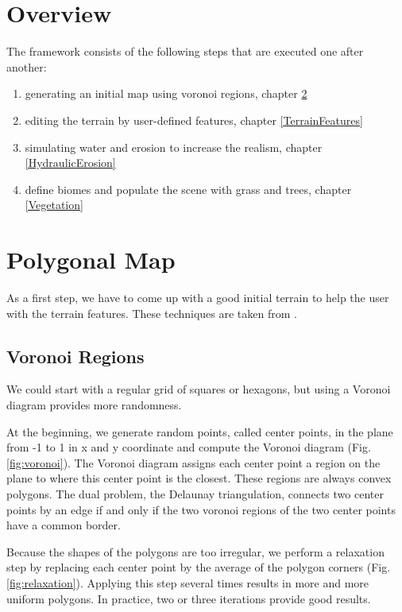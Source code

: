 \documentclass[journal, letterpaper]{IEEEtran}
\begin{document}
\section{Overview}
The framework consists of the following steps that are executed one after another:
\begin{enumerate}
	\item generating an initial map using voronoi regions, chapter \ref{PolygonalMap}
	\item editing the terrain by user-defined features, chapter \ref{TerrainFeatures}
	\item simulating water and erosion to increase the realism, chapter \ref{HydraulicErosion}
	\item define biomes and populate the scene with grass and trees, chapter \ref{Vegetation}
\end{enumerate}

\section{Polygonal Map}\label{PolygonalMap}
As a first step, we have to come up with a good initial terrain to help the user with the terrain features.
These techniques are taken from \cite{AmitPatel.2010}.

\subsection{Voronoi Regions}
We could start with a regular grid of squares or hexagons, but using a Voronoi diagram provides more randomness.

At the beginning, we generate random points, called center points, in the plane from -1 to 1 in x and y coordinate and compute the Voronoi diagram (Fig. \ref{fig:voronoi}).
The Voronoi diagram assigns each center point a region on the plane to where this center point is the closest. These regions are always convex polygons. The dual problem, the Delaunay triangulation, connects two center points by an edge if and only if the two voronoi regions of the two center points have a common border.

Because the shapes of the polygons are too irregular, we perform a relaxation step by replacing each center point by the average of the polygon corners (Fig. \ref{fig:relaxation}).
Applying this step several times results in more and more uniform polygons. In practice, two or three iterations provide good results.
\end{document}
